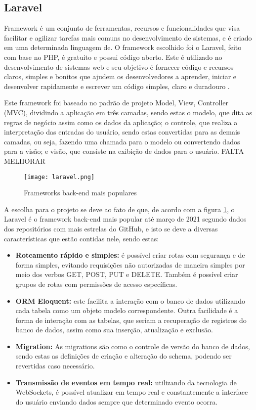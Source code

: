 \subsection{Laravel}
Framework é um conjunto de ferramentas, recursos e funcionalidades que visa facilitar e agilizar tarefas mais comuns no desenvolvimento de sistemas, e é criado em uma determinada linguagem de. O framework escolhido foi o Laravel, feito com base no PHP, é gratuito e possui código aberto. Este é utilizado no desenvolvimento de sistemas web e seu objetivo é fornecer código e recursos claros, simples e bonitos que ajudem os desenvolvedores a aprender, iniciar e desenvolver rapidamente e escrever um código simples, claro e duradouro \cite{STAUFFER}. 

Este framework foi baseado no padrão de projeto Model, View, Controller (MVC), dividindo a aplicação em três camadas, sendo estas o modelo, que dita as regras de negócio assim como os dados da aplicação; o controle, que realiza a interpretação das entradas do usuário, sendo estas convertidas para as demais camadas, ou seja, fazendo uma chamada para o modelo ou convertendo dados para a visão; e visão, que consiste na exibição de dados para o usuário. 
FALTA MELHORAR
\begin{figure}[h]
    \caption{\label{framework_popular}Frameworks back-end mais populares}
    \vspace{5pt}
    \centering
    \texttt{[image: laravel.png]}
    \vspace{5pt}
\end{figure}

A escolha para o projeto se deve ao fato de que, de acordo com a figura \ref{framework_popular}, o Laravel é o framework back-end mais popular até março de 2021 segundo dados dos repositórios com mais estrelas do GitHub, e isto se deve a diversas características que estão contidas nele, sendo estas:
\begin{itemize}
    \item \textbf{Roteamento rápido e simples:} é possível criar rotas com segurança e de forma simples, evitando requisições não autorizadas de maneira simples por meio dos verbos GET, POST, PUT e DELETE. Também é possível criar grupos de rotas com permissões de acesso específicas.
    \item \textbf{ORM Eloquent:} este facilita a interação com o banco de dados utilizando cada tabela como um objeto modelo correspondente. Outra facilidade é a forma de interação com as tabelas, que seriam a recuperação de registros do banco de dados, assim como sua inserção, atualização e exclusão.
    \item \textbf{Migration:} As migrations são como o controle de versão do banco de dados, sendo estas as definições de criação e alteração do schema, podendo ser revertidas caso necessário.
    \item \textbf{Transmissão de eventos em tempo real:} utilizando da tecnologia de WebSockets, é possível atualizar em tempo real e constantemente a interface do usuário enviando dados sempre que determinado evento ocorra.
\end{itemize}

